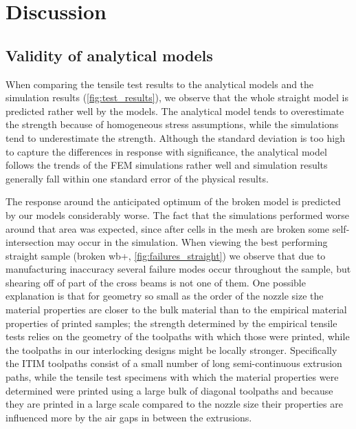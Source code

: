 \section{Discussion}
\subsection{Validity of analytical models}

When comparing the tensile test results to the analytical models and the simulation results (\cref{fig:test_results}),
we observe that the whole straight model is predicted rather well by the models.
The analytical model tends to overestimate the strength because of homogeneous stress assumptions,
while the simulations tend to underestimate the strength.
Although the standard deviation is too high to capture the differences in response with significance,
the analytical model follows the trends of the FEM simulations rather well and simulation results generally fall within one standard error of the physical results.

The response around the anticipated optimum of the broken model is predicted by our models considerably worse.
The fact that the simulations performed worse around that area was expected, since after cells in the mesh are broken some self-intersection may occur in the simulation.
When viewing the best performing straight sample (broken wb+, \cref{fig:failures_straight}) we observe that due to manufacturing inaccuracy several failure modes occur throughout the sample,
but shearing off of part of the cross beams is not one of them.
One possible explanation is that for geometry so small as the order of the nozzle size the material properties are closer to the bulk material than to the empirical material properties of printed samples;
the strength determined by the empirical tensile tests relies on the geometry of the toolpaths with which those were printed, while the toolpaths in our interlocking designs might be locally stronger.
Specifically the ITIM toolpaths consist of a small number of long semi-continuous extrusion paths, while %
the tensile test specimens with which the material properties were determined were printed using a large bulk of diagonal toolpaths
and because they are printed in a large scale compared to the nozzle size their properties are influenced more by the air gaps in between the extrusions.

